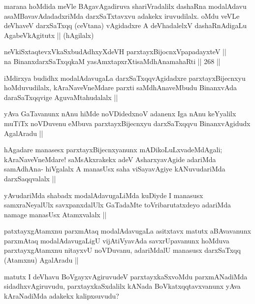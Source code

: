 \begin{artha}
marana hoMdida meVle BAgavAgadiruva shariVradalilx dashaRna modalAdavu asaMBavavAdadadxriMda darxSaTxtavxvu adakekx iruvudilalx. oMdu veVLe deVhaveV darxSaTxqq (ceVtana) vAgidadxre A deVhadalelxV dashaRnAdigaLu AgabeVkAgitutx || (hAgilalx)
\end{artha}

\begin{shl}
neVkiSxtaqtevxV\s kaSxbudAdhxyXdeVH parxtayxBijocnxVpapadayxteV || \\
na BinanxdarxSaTxqqkaM yasAmxtapxrXtisaMdhAnamahaRti ||  268 ||  
\end{shl}

\begin{artha}
iMdirxya budidhx modalAdavugaLa darxSaTxqqvAgidadxre parxtayxBijecnxyu hoMduvudilalx, kAraNaveVneMdare parxti saMdhAnaveMbudu BinanxvAda daraSaTxqqvige AguvaMtahudalalx ||
\end{artha}

\begin{artha}
yAva GaTavanunx nAnu hiMde noVDidedxnoV adanenx Iga nAnu keYyalilx muTiTx noVDuvenu eMbuva parxtayxBijecnxyu darxSaTxqqvu BinanxvAgidudx AgalAradu ||  
\end{artha}

\begin{artha}
hAgadare manasesx parxtayxBijecnxyanunx mADikoLuLxvadeMdAgali; kAraNaveVneMdare! saMsAkxrakekx adeV AsharxyavAgide adariMda samAdhAna- hiVgalalx A manasUsx saha viSayavAgiye kANuvudariMda darxSaqqvalalx ||
\end{artha}

\begin{artha}
yAvudariMda shabadx modalAdavugaLiMda kuDiyde I manasusx samxraNeyalUlx savxpanxdalUlx GaTadaMte toVribarutatxdeyo adariMda namage manasUsx Atamxvalalx ||
\end{artha}

\begin{artha}
patxtayxgAtamxnu parxmAtaq modalAdavugaLa asitxtavx matutx aBAvavanunx parxmAtaq modalAdavugaLigU vijAtiVyavAda savxrUpavanunx hoMduva parxtayxgAtamxnu nitayxvU noVDuvanu, adariMdalU manasusx darxSaTxqq (Atamxnu) AgalAradu ||
\end{artha}

\begin{artha}
matutx I deVhavu BoVgayxvAgiruvudeV parxtayxkaSxvoMdu parxmANadiMda sidadhxvAgiruvudu, parxtayxkaSxdalilx kANada BoVkatxqqtavxvanunx yAva kAraNadiMda adakekx kalipxsuvudu?
\end{artha}

